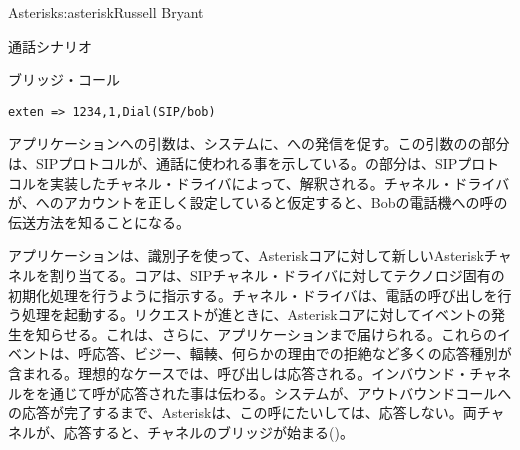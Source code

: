 \begin{aosachapter}{Asterisk}{s:asterisk}{Russell Bryant}
\begin{aosasect1}{通話シナリオ}
\begin{aosasect2}{ブリッジ・コール}
\begin{verbatim}
exten => 1234,1,Dial(SIP/bob)
\end{verbatim}

\noindent {}アプリケーションへの引数は、システムに、への発信を促す。この引数のの部分は、SIPプロトコルが、通話に使われる事を示している。の部分は、SIPプロトコルを実装したチャネル・ドライバによって、解釈される。チャネル・ドライバが、へのアカウントを正しく設定していると仮定すると、Bobの電話機への呼の伝送方法を知ることになる。

アプリケーションは、識別子を使って、Asteriskコアに対して新しいAsteriskチャネルを割り当てる。コアは、SIPチャネル・ドライバに対してテクノロジ固有の初期化処理を行うように指示する。チャネル・ドライバは、電話の呼び出しを行う処理を起動する。リクエストが進ときに、Asteriskコアに対してイベントの発生を知らせる。これは、さらに、アプリケーションまで届けられる。これらのイベントは、呼応答、ビジー、輻輳、何らかの理由での拒絶など多くの応答種別が含まれる。理想的なケースでは、呼び出しは応答される。インバウンド・チャネルをを通じて呼が応答された事は伝わる。システムが、アウトバウンドコールへの応答が完了するまで、Asteriskは、この呼にたいしては、応答しない。両チャネルが、応答すると、チャネルのブリッジが始まる()。


\end{aosasect2}
\end{aosasect1}
\end{aosachapter}
